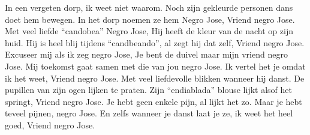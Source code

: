 \clearpage
\begin{translation}
In een vergeten dorp, ik weet niet waarom.
Noch zijn gekleurde personen dans doet hem bewegen.
In het dorp noemen ze hem Negro Jose,
Vriend negro Jose.
Met veel liefde “candobea” Negro Jose,
Hij heeft de kleur van de nacht op zijn huid.
Hij is heel blij tijdens “candbeando”, al zegt hij dat zelf,
Vriend negro Jose.
Excuseer mij als ik zeg negro Jose,
Je bent de duivel maar mijn vriend negro Jose.
Mij toekomst gaat samen met die van jou negro Jose.
Ik vertel het je omdat ik het weet,
Vriend negro Jose.
Met veel liefdevolle blikken wanneer hij danst.
De pupillen van zijn ogen lijken te praten.
Zijn “endiablada” blouse lijkt alsof het springt,
Vriend negro Jose.
Je hebt geen enkele pijn, al lijkt het zo.
Maar je hebt teveel pijnen, negro Jose.
En zelfs wanneer je danst laat je ze, ik weet het heel goed,
Vriend negro Jose.
\end{translation}
